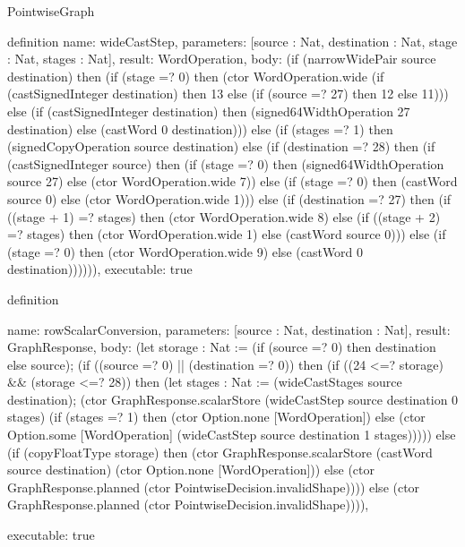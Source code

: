 \begin{lexlean}{PointwiseGraph}
\begin{semanticmodule}
definition{
  name: wideCastStep,
  parameters: [source : Nat, destination : Nat, stage : Nat, stages : Nat],
  result: WordOperation,
  body: (if (narrowWidePair source destination) then
    (if (stage =? 0) then (ctor WordOperation.wide (if (castSignedInteger destination) then 13 else (if (source =? 27) then 12 else 11)))
     else (if (castSignedInteger destination) then (signed64WidthOperation 27 destination) else (castWord 0 destination)))
    else (if (stages =? 1) then (signedCopyOperation source destination) else
    (if (destination =? 28) then
      (if (castSignedInteger source) then (if (stage =? 0) then (signed64WidthOperation source 27) else (ctor WordOperation.wide 7))
      else (if (stage =? 0) then (castWord source 0) else (ctor WordOperation.wide 1)))
    else (if (destination =? 27) then
      (if ((stage + 1) =? stages) then (ctor WordOperation.wide 8) else
      (if ((stage + 2) =? stages) then (ctor WordOperation.wide 1) else (castWord source 0)))
    else (if (stage =? 0) then (ctor WordOperation.wide 9) else (castWord 0 destination)))))),
  executable: true
}

definition{
  name: rowScalarConversion,
  parameters: [source : Nat, destination : Nat],
  result: GraphResponse,
  body: (let storage : Nat := (if (source =? 0) then destination else source);
    (if ((source =? 0) || (destination =? 0)) then (if ((24 <=? storage) && (storage <=? 28)) then
    (let stages : Nat := (wideCastStages source destination);
      (ctor GraphResponse.scalarStore (wideCastStep source destination 0 stages)
        (if (stages =? 1) then (ctor Option.none [WordOperation]) else (ctor Option.some [WordOperation] (wideCastStep source destination 1 stages)))))
    else (if (copyFloatType storage) then (ctor GraphResponse.scalarStore (castWord source destination) (ctor Option.none [WordOperation]))
      else (ctor GraphResponse.planned (ctor PointwiseDecision.invalidShape))))
    else (ctor GraphResponse.planned (ctor PointwiseDecision.invalidShape)))),

  executable: true
}


\end{semanticmodule}
\end{lexlean}
